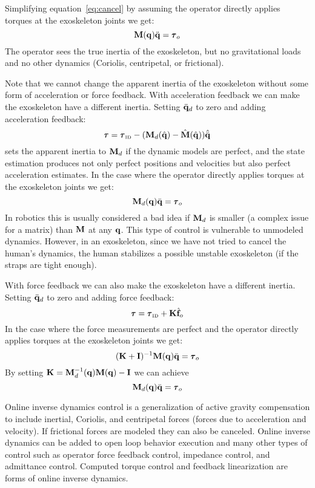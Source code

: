 \documentclass[letterpaper,12pt,fullpage]{article}
\newcommand{\invdyn}{{\mbox {\tiny ID}}}
\begin{document}
Simplifying equation~\ref{eq:cancel} by 
assuming the operator directly applies torques at the
exoskeleton joints we get:
\begin{equation}
\mM (\vq) \ddot{\vq} = \vtau_o
\end{equation}
The operator sees the true inertia of the exoskeleton, but no gravitational
loads and no other dynamics (Coriolis, centripetal, or frictional).

Note that we cannot change the apparent inertia of the exoskeleton without
some form of acceleration or force feedback.
With acceleration feedback we can make the exoskeleton have a different inertia.
Setting $\ddot{{\bf q}}_d$ to zero and adding acceleration feedback:
\begin{equation}
\vtau = \vtau_{\invdyn} - (\mM_d(\hat{\vq}) - \hat{\mM}(\hat{\vq})) \hat{\ddot{\vq}}
\label{eq:change-inertia1}
\end{equation}
sets the apparent inertia to ${\bf M}_d$ if the dynamic models are perfect, and
the state estimation produces not only perfect positions and velocities but
also perfect acceleration estimates. In the case 
where the operator directly applies torques at the
exoskeleton joints we get:
\begin{equation}
\mM_d (\vq) \ddot{\vq} = \vtau_o
\end{equation}
In robotics this is usually considered a bad idea if ${\bf M}_d$ is smaller (a complex
issue for a matrix) than ${\bf M}$ at any ${\bf q}$. This type of control is vulnerable
to unmodeled dynamics. However, in an exoskeleton, since we have not tried to
cancel the human's dynamics, the human stabilizes a possible unstable exoskeleton
(if the straps are tight enough).

With force feedback we can also make the exoskeleton have a different inertia.
Setting $\ddot{{\bf q}}_d$ to zero and adding force feedback:
\begin{equation}
\vtau = \vtau_{\invdyn} + \mK \hat{\vf}_o
\end{equation}
In the case where the force measurements are perfect and 
the operator directly applies torques at the
exoskeleton joints we get:
\begin{equation}
(\mK + \mI)^{-1} \mM (\vq) \ddot{\vq} = \vtau_o
\end{equation}
By setting ${\bf K} = {\bf M}^{-1}_d ({\bf q}) {\bf M} ({\bf q}) - {\bf I}$ we can achieve
\begin{equation}
\mM_d (\vq) \ddot{\vq} = \vtau_o
\end{equation}

Online inverse dynamics control is a generalization of active gravity compensation to include
inertial, Coriolis, and centripetal forces (forces due to acceleration and
velocity).
If frictional forces are modeled they can also be canceled.
Online inverse dynamics can be added to open loop behavior execution
and many other types of control such as operator force
feedback control, impedance control, and admittance control.
Computed torque control and feedback linearization are forms of online
inverse dynamics.
\end{document}
